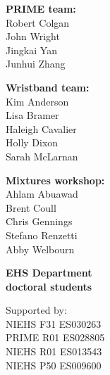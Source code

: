 \documentclass{beamer}
\begin{document}
{\begin{columns}

\begin{flushright}
\tiny
{\color{matbluedark} \textbf{PRIME team:}} \\
            Robert Colgan \\
            John Wright \\
            Jingkai Yan \\
            Junhui Zhang \\

\vspace{2mm}

{\color{matbluedark} \textbf{Wristband team:}} \\
Kim Anderson \\
Lisa Bramer \\
Haleigh Cavalier \\
Holly Dixon \\
Sarah McLarnan \\

\vspace{2mm}

{\color{matbluedark} \textbf{Mixtures workshop:}} \\
Ahlam Abuawad \\
Brent Coull \\
Chris Gennings \\
Stefano Renzetti \\
Abby Welbourn \\

\vspace{2mm}

{\color{matbluedark} \textbf{EHS Department \\ doctoral students}}

\vspace{2mm}

{\tiny\color{gray}Supported by: \\
NIEHS F31 ES030263 \\
PRIME R01 ES028805 \\
NIEHS R01 ES013543 \\
NIEHS P50 ES009600 \\
}

\end{flushright}

\end{columns}
}
\end{document}

